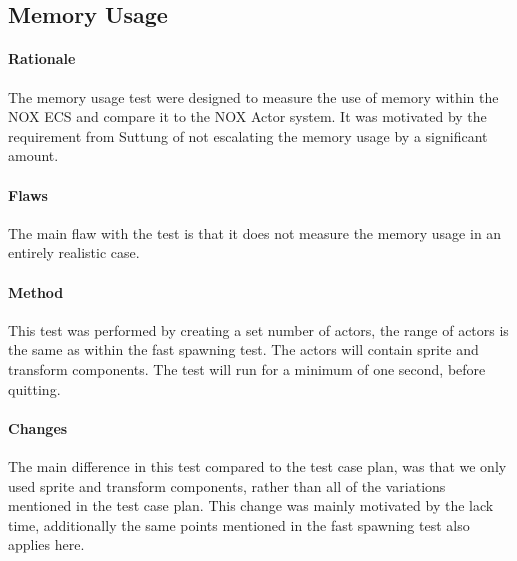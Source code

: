 \subsection{Memory Usage}
\paragraph{Rationale}
The memory usage test were designed to measure the use of memory within the NOX ECS and compare it to the NOX Actor system.
It was motivated by the requirement from Suttung of not escalating the memory usage by a significant amount.

\paragraph{Flaws}
The main flaw with the test is that it does not measure the memory usage in an entirely realistic case.

\paragraph{Method}
This test was performed by creating a set number of actors, the range of actors is the same as within the fast spawning test.
The actors will contain sprite and transform components.
The test will run for a minimum of one second, before quitting.

\paragraph{Changes}
The main difference in this test compared to the test case plan, was that we only used sprite and transform components,
rather than all of the variations mentioned in the test case plan.
This change was mainly motivated by the lack time, additionally the same points mentioned in the fast spawning test also applies here.


